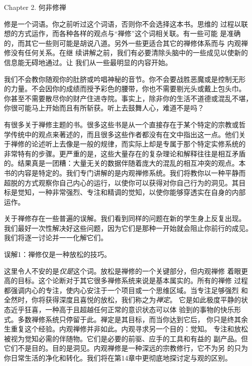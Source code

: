 


\beginchapter Chapter 2. 何非修禅


{
\parindent=3pc
\noindent\hang{}
\1%
{修是一个词语}。你之前听过这个词语，否则你不会选择这本书。思维的
过程以联想的方式运作，而各种各样的观点与“禅修”这个词相关联。有一些可能
是准确的，而其它一些则可能是胡说八道。另外一些更适合其它的禅修体系而与
内观禅修没有任何关系。在继
续讲解之前，我们有必要清除头脑中的一些成见以使新的信息能无碍地通过。让
我们从一些最明显的内容开始。

}

我们不会教你随观你的肚脐或吟唱神秘的音节。你不会要战胜恶魔或是控制无形
的力量。不会因你的成绩而授予彩色的腰带，你也不需要剔光头或戴上包头巾。
你甚至不需要散尽你的财产住进寺院。事实上，除非你的生活不道德或混乱不堪，
你很可能马上开始而且有所斩获。听上去鼓舞人心，难道不是吗？

有很多关于禅修主题的书。很多这些书是从一个直接存在于某个特定的宗教或哲
学传统中的观点来著述的，而且很多这些作者都没有在文中指出这一点。他们关
于禅修的论述听上去像是一般的规律，而实际上却是专属于那个特定实修系统的
非常\1特有的步骤。更严重的是，这些大量存在的复杂理论和解释往往是相互矛盾
的。结果真是一团糟：大量无关的数据伴随着庞大的混乱的相互冲突的观点。本
书的内容是特定的。我们专门讲解的是内观禅修系统。我们将教你以一种平静而
超脱的方式观察你自己内心的运行，以使你可以获得对你自己行为的洞见。其目
标是觉知，一种非常强烈、专注和精调的觉知，以使你能够穿透实在自身的内部
运作。

关于禅修存在一些普遍的误解。我们看到同样的问题在新的学生身上反复出现。
我们最好一次性解决好这些问题，因为它们是那种一开始就会阻止你前行的成见。
我们将逐一讨论并一一化解它们。

\subsectnon 误解1：禅修仅是一种放松的技巧。

这里令人不安的是{\it 仅是}这个词。放松是禅修的一个关键部分，但内观禅修
着眼更高的目标。这个论断对于其它很多禅修系统来说是基本属实的。所有的禅修
过程都强调内心的专注，使内心安注于一个项目或一个思维区域。当专注足够强烈
和全然时，你将获得深度且喜悦的放松，我们称之为{\it 禅定}。
它是如此极度平静的状态近乎狂喜，一种高于且超越任何正常的意识状态可以体
验到的事物的快乐形式。多数禅修系统只停留于此。禅定是其目标，而当你达到它后，
你只是终其余生重复这个经验。内观禅修\1并非如此。内观寻求另一个目的：觉知。
专注和放松被视为觉知必需的伴随物。它们是必要的前驱、应手的工具和有益的
副产品。但它们不是目的。目的是洞见。内观禅修是一种深远的宗教修行，它不为另
的只为你日常生活的净化和转化。我们将在第14章中更彻底地探讨定与观的区别。

